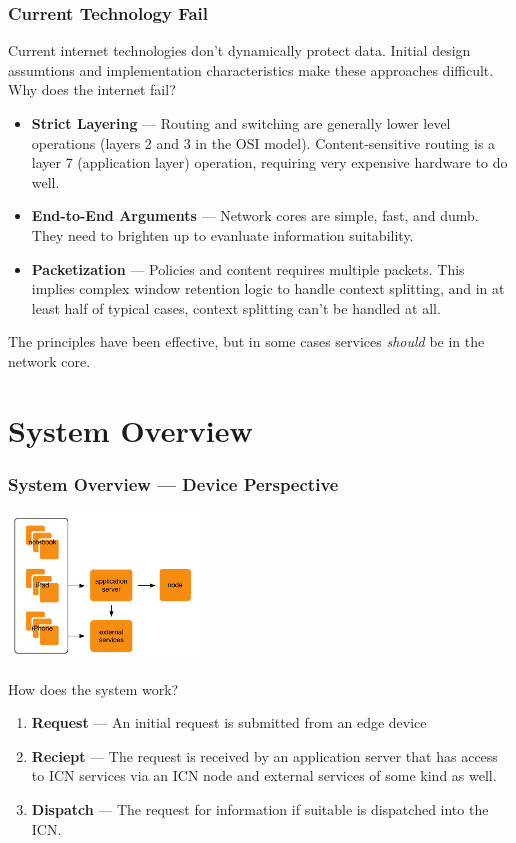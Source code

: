 \documentclass[t,handout, 10pt]{beamer}
\begin{document}
\begin{frame}
\frametitle{Current Technology Fail}
Current internet technologies don't dynamically protect data.  Initial design assumtions and implementation characteristics make these approaches difficult.
\pause
\newline
\newline
Why does the internet fail?
{\small
\begin{itemize}
\item {\bf Strict Layering} --- Routing and switching are generally lower level operations (layers 2 and 3 in the OSI model).  Content-sensitive routing is a layer 7 (application layer) operation, requiring very expensive hardware to do well. 
\item {\bf End-to-End Arguments} --- Network cores are simple, fast, and dumb.  They need to brighten up to evanluate information suitability.  
\item {\bf Packetization} --- Policies and content requires multiple packets.  This implies complex window retention logic to handle context splitting, and in at least half of typical cases, context splitting can't be handled at all.
\end{itemize}
}
The principles have been effective, but in some cases services {\it should} be in the network core.
\end{frame}

\section{System Overview}
\begin{frame}
\frametitle{System Overview --- Device Perspective}
\centerline{\includegraphics[width=2in]{overall-view}}
How does the system work?
\pause
{\small
\begin{enumerate}
\item {\bf Request} --- An initial request is submitted from an edge device
\pause
\item {\bf Reciept} --- The request is received by an application server that has access to ICN services via an ICN node and external services of some kind as well.
\pause
\item {\bf Dispatch} --- The request for information if suitable is dispatched into the ICN.
\end{enumerate}
}
\end{frame}
\end{document}
